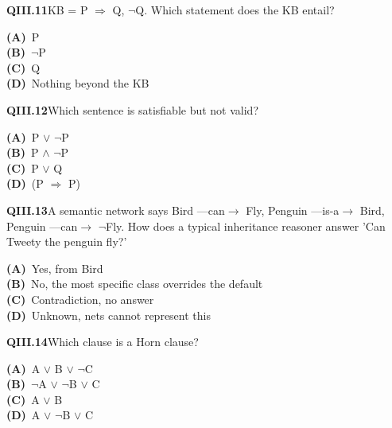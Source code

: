 \begin{tcolorbox}[enhanced,breakable,colback=white,colframe=navyL,arc=2mm,boxrule=0.7pt,left=3mm,right=3mm,top=2mm,bottom=2mm]
\textbf{\color{navy}QIII.11}\quad KB = {P $\Rightarrow$ Q, $\neg$Q}. Which statement does the KB entail?\hfill{}\par\smallskip
{\small \textbf{\color{navyL}(A)}\ P\\[1pt]\textbf{\color{navyL}(B)}\ $\neg$P\\[1pt]\textbf{\color{navyL}(C)}\ Q\\[1pt]\textbf{\color{navyL}(D)}\ Nothing beyond the KB}
\end{tcolorbox}
\begin{tcolorbox}[enhanced,breakable,colback=white,colframe=navyL,arc=2mm,boxrule=0.7pt,left=3mm,right=3mm,top=2mm,bottom=2mm]
\textbf{\color{navy}QIII.12}\quad Which sentence is satisfiable but not valid?\hfill{}\par\smallskip
{\small \textbf{\color{navyL}(A)}\ P $\vee$ $\neg$P\\[1pt]\textbf{\color{navyL}(B)}\ P $\wedge$ $\neg$P\\[1pt]\textbf{\color{navyL}(C)}\ P $\vee$ Q\\[1pt]\textbf{\color{navyL}(D)}\ (P $\Rightarrow$ P)}
\end{tcolorbox}
\begin{tcolorbox}[enhanced,breakable,colback=white,colframe=navyL,arc=2mm,boxrule=0.7pt,left=3mm,right=3mm,top=2mm,bottom=2mm]
\textbf{\color{navy}QIII.13}\quad A semantic network says Bird ---can$\to$ Fly, Penguin ---is-a$\to$ Bird, Penguin ---can$\to$ $\neg$Fly. How does a typical inheritance reasoner answer 'Can Tweety the penguin fly?'\hfill{}\par\smallskip
{\small \textbf{\color{navyL}(A)}\ Yes, from Bird\\[1pt]\textbf{\color{navyL}(B)}\ No, the most specific class overrides the default\\[1pt]\textbf{\color{navyL}(C)}\ Contradiction, no answer\\[1pt]\textbf{\color{navyL}(D)}\ Unknown, nets cannot represent this}
\end{tcolorbox}
\begin{tcolorbox}[enhanced,breakable,colback=white,colframe=navyL,arc=2mm,boxrule=0.7pt,left=3mm,right=3mm,top=2mm,bottom=2mm]
\textbf{\color{navy}QIII.14}\quad Which clause is a Horn clause?\hfill{}\par\smallskip
{\small \textbf{\color{navyL}(A)}\ A $\vee$ B $\vee$ $\neg$C\\[1pt]\textbf{\color{navyL}(B)}\ $\neg$A $\vee$ $\neg$B $\vee$ C\\[1pt]\textbf{\color{navyL}(C)}\ A $\vee$ B\\[1pt]\textbf{\color{navyL}(D)}\ A $\vee$ $\neg$B $\vee$ C}
\end{tcolorbox}
